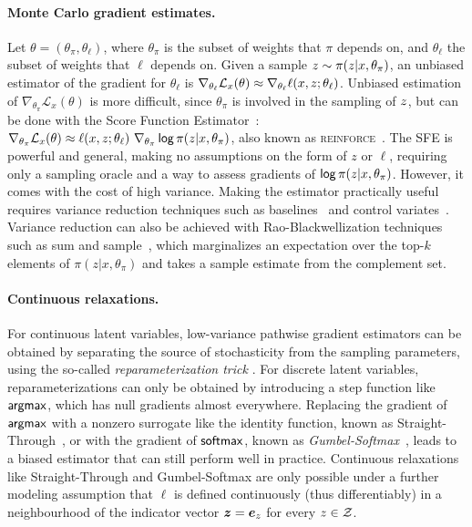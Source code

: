 \paragraph*{Monte Carlo gradient estimates.} Let $\theta=(\theta_\pi,
        \theta_\ell)$, where $\theta_\pi$ is the subset of weights that $\pi$
depends on, and $\theta_\ell$ the subset of weights that $\ell$
depends on. Given a sample $z \sim \pi(z| x,\theta_\pi)$, an
unbiased estimator of the gradient for  \wrt
$\theta_\ell$ is $\nabla_{\theta_\ell} \mathcal L_x(\theta) \approx
        \nabla_{\theta_\ell} \ell(x, z; \theta_\ell)$. Unbiased
estimation of $\nabla_{\theta_\pi} \mathcal L_x(\theta)$ is more
difficult, since $\theta_\pi$ is involved in the sampling of
$z$, but can be done with the Score Function
Estimator~\citep[SFE;][]{rubinstein1976monte,paisley2012variational}:
$\nabla_{\theta_\pi} \mathcal L_x(\theta) \approx \ell(x, z;
        \theta_\ell) ~ \nabla_{\theta_\pi} \operatorname*{\mathsf{log}} \pi(z | x, \theta_\pi)$,
also known as \textsc{reinforce}~\citep{Williams1992}. The SFE is
powerful and general, making no assumptions on the form of $z$ or
$\ell$, requiring only a sampling oracle and a way to assess
gradients of $\operatorname*{\mathsf{log}} \pi(z | x, \theta_\pi)$. However, it comes
with the cost of high variance. Making the estimator practically
useful requires variance reduction techniques such as
baselines~\citep{Williams1992,MuProp} and control
variates~\citep{CV2013,REBAR,RELAX}. Variance reduction can also be
achieved with Rao-Blackwellization techniques such as sum and
sample~\citep{casella1996rao,BBVI14,RB19}, which marginalizes an
expectation over the top-$k$ elements of $\pi(z| x,\theta_\pi)$ and
takes a sample estimate from the complement set.

\paragraph*{Continuous relaxations.} For continuous latent variables,
low-variance pathwise gradient estimators can be obtained by
separating the source of stochasticity from the sampling parameters,
using the so-called \emph{reparameterization trick}
\citep{Kingma+2014:VAE,RezendeEtAl14VAE}. For discrete latent
variables, reparameterizations can only be obtained by introducing a
step function like $\operatorname*{\mathsf{argmax}}$, which has null gradients almost everywhere.
Replacing the gradient of $\operatorname*{\mathsf{argmax}}$ with a nonzero surrogate like the identity
function, known as Straight-Through~\citep{STE}, or with the gradient of $\operatorname*{\mathsf{softmax}}$, known
as \emph{Gumbel-Softmax}~\citep{Concrete,GumbelSoftmax}, leads to a
biased estimator that can still perform well in practice. Continuous
relaxations like Straight-Through and Gumbel-Softmax are only
possible under a further modeling assumption that $\ell$ is defined
continuously (thus differentiably) in a neighbourhood of the
indicator vector $\bm{z} = \bm{e}_{z}$ for every $z \in \mathcal{Z}$.

